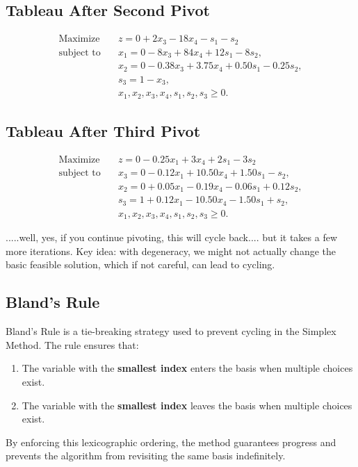 \subsection*{Tableau After Second Pivot}
\[
\begin{aligned}
\text{Maximize} \quad & z = 0 + 2x_3 - 18x_4 - s_1 - s_2 \\
\text{subject to} \quad 
& x_1 = 0 - 8x_3 + 84x_4 + 12s_1 - 8s_2, \\
& x_2 = 0 - 0.38x_3 + 3.75x_4 + 0.50s_1 - 0.25s_2, \\
& s_3 = 1 - x_3, \\
& x_1, x_2, x_3, x_4, s_1, s_2, s_3 \geq 0.
\end{aligned}
\]

\subsection*{Tableau After Third Pivot}
\[
\begin{aligned}
\text{Maximize} \quad & z = 0 - 0.25x_1 + 3x_4 + 2s_1 - 3s_2 \\
\text{subject to} \quad 
& x_3 = 0 - 0.12x_1 + 10.50x_4 + 1.50s_1 - s_2, \\
& x_2 = 0 + 0.05x_1 - 0.19x_4 - 0.06s_1 + 0.12s_2, \\
& s_3 = 1 + 0.12x_1 - 10.50x_4 - 1.50s_1 + s_2, \\
& x_1, x_2, x_3, x_4, s_1, s_2, s_3 \geq 0.
\end{aligned}
\]

.....well, yes, if you continue pivoting, this will cycle back.... but it takes a few more iterations.  Key idea: with degeneracy, we might not actually change the basic feasible solution, which if not careful, can lead to cycling.


\subsection{Bland's Rule}
Bland's Rule is a tie-breaking strategy used to prevent cycling in the Simplex Method. The rule ensures that:
\begin{enumerate}
    \item The variable with the \textbf{smallest index} enters the basis when multiple choices exist.
    \item The variable with the \textbf{smallest index} leaves the basis when multiple choices exist.
\end{enumerate}
By enforcing this lexicographic ordering, the method guarantees progress and prevents the algorithm from revisiting the same basis indefinitely.

